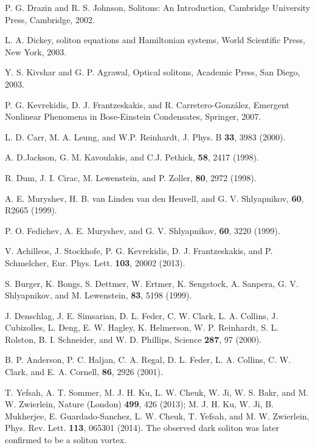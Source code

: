 \documentclass[prl,aps,twocolumn,showpacs, floatfix]{revtex4}
\begin{document}
\begin{thebibliography}{99}
 {P. G. Drazin and R. S. Johnson, Solitons: An
Introduction, Cambridge University Press, Cambridge, 2002.}

 {L. A. Dickey, soliton equations and Hamiltonian
systems, World Scientific Press, New York, 2003.}

 {Y. S. Kivshar and G. P. Agrawal, Optical solitons,
Academic Press, San Diego, 2003. }

 {P. G. Kevrekidis, D. J. Frantzeskakis, and R.
Carretero-Gonz\'{a}lez, Emergent Nonlinear Phenomena in Bose-Einstein
Condensates, Springer, 2007.}

 L. D. Carr, M. A. Leung, and W.P. Reinhardt, J. Phys.
B \textbf{33}, 3983 (2000).

 A. D.Jackson, G. M. Kavoulakis, and C.J. Pethick,
\pra
\textbf{58}, 2417 (1998).

 R. Dum, J. I. Cirac, M. Lewenstein, and P. Zoller,
\prl
\textbf{80}, 2972 (1998).

 A. E. Muryshev, H. B. van Linden van den Heuvell,
and G. V. Shlyapnikov, \pra \textbf{60}, R2665 (1999).

 P. O. Fedichev, A. E. Muryshev, and G. V.
Shlyapnikov, \pra
\textbf{60}, 3220 (1999).

 {V. Achilleos, J. Stockhofe, P. G. Kevrekidis, D. J.
Frantzeskakis, and P. Schmelcher, Eur. Phys. Lett. \textbf{103}, 20002
(2013). }

 S. Burger, K. Bongs, S. Dettmer, W. Ertmer, K.
Sengstock, A. Sanpera, G. V. Shlyapnikov, and M. Lewenstein, \prl
\textbf{83}, 5198 (1999).

 J. Denschlag, J. E. Simsarian, D. L. Feder,
C. W. Clark, L. A. Collins, J. Cubizolles, L. Deng, E. W. Hagley, K.
Helmerson, W. P. Reinhardt, S. L. Rolston, B. I. Schneider, and W. D.
Phillips, Science \textbf{287}, 97 (2000).

 B. P. Anderson, P. C. Haljan, C. A. Regal, D. L.
Feder, L. A. Collins, C. W. Clark, and E. A. Cornell, \prl\textbf{86}, 2926
(2001).

 {T. Yefsah, A. T. Sommer, M. J. H. Ku, L. W.
Cheuk, W. Ji, W. S. Bakr, and M. W. Zwierlein, Nature (London) \textbf{499},
426 (2013); M. J. H. Ku, W. Ji, B. Mukherjee, E. Guardado-Sanchez, L. W.
Cheuk, T. Yefsah, and M. W. Zwierlein, Phys. Rev. Lett. \textbf{113}, 065301
(2014). The observed dark soliton was later confirmed to be a soliton
vortex. }


\end{thebibliography}
\end{document}
